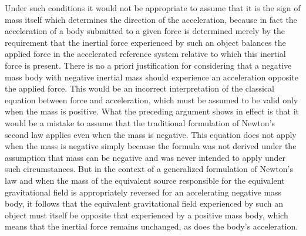 \documentclass[notitlepage,12pt]{report}
\begin{document}
Under such conditions it would not be appropriate to assume that it is the sign of mass itself which determines the direction of the acceleration, because in fact the acceleration of a body submitted to a given force is determined merely by the requirement that the inertial force experienced by such an object balances the applied force in the accelerated reference system relative to which this inertial force is present. There is no a priori justification for considering that a negative mass body with negative inertial mass should experience an acceleration opposite the applied force. This would be an incorrect interpretation of the classical equation between force and acceleration, which must be assumed to be valid only when the mass is positive. What the preceding argument shows in effect is that it would be a mistake to assume that the traditional formulation of Newton's second law applies even when the mass is negative. This equation does not apply when the mass is negative simply because the formula was not derived under the assumption that mass can be negative and was never intended to apply under such circumstances. But in the context of a generalized formulation of Newton's law and when the mass of the equivalent source responsible for the equivalent gravitational field is appropriately reversed for an accelerating negative mass body, it follows that the equivalent gravitational field experienced by such an object must itself be opposite that experienced by a positive mass body, which means that the inertial force remains unchanged, as does the body's acceleration.
\end{document}
